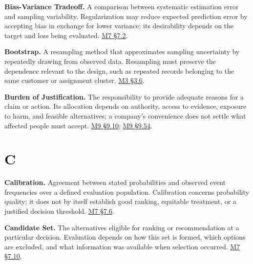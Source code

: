 \noindent\textbf{Bias-Variance Tradeoff.} A comparison between systematic
estimation error and sampling variability. Regularization may reduce
expected prediction error by accepting bias in exchange for lower
variance; its desirability depends on the target and loss being
evaluated.
\href{Marketing_Analytics_Lecture_Notes.pdf\#M07-baselines-loss-functions-and-regularization}{M7
§7.2}.

\noindent\textbf{Bootstrap.} A resampling method that approximates sampling
uncertainty by repeatedly drawing from observed data. Resampling must
preserve the dependence relevant to the design, such as repeated records
belonging to the same customer or assignment cluster.
\href{Marketing_Analytics_Lecture_Notes.pdf\#M03-uncertainty-dependence-and-practical-importance}{M3
§3.6}.

\noindent\textbf{Burden of Justification.} The responsibility to provide adequate
reasons for a claim or action. Its allocation depends on authority,
access to evidence, exposure to harm, and feasible alternatives; a
company's convenience does not settle what affected people must accept.
\hyperref[M09-self-interest-and-the-burden-of-justification]{M9
§9.10};
\hyperref[M09-who-ought-to-bear-the-burden-of-producing-evidence]{M9
§9.54}.

\par{}
\hypertarget{module-c}{%
\section*{C}\label{module-c}}

\noindent\textbf{Calibration.} Agreement between stated probabilities and
observed event frequencies over a defined evaluation population.
Calibration concerns probability quality; it does not by itself
establish good ranking, equitable treatment, or a justified decision
threshold.
\href{Marketing_Analytics_Lecture_Notes.pdf\#M07-ranking-and-calibration-answer-different-questions}{M7
§7.6}.

\noindent\textbf{Candidate Set.} The alternatives eligible for ranking or
recommendation at a particular decision. Evaluation depends on how this
set is formed, which options are excluded, and what information was
available when selection occurred.
\href{Marketing_Analytics_Lecture_Notes.pdf\#M07-recommendation-models-and-the-candidate-set}{M7
§7.10}.

